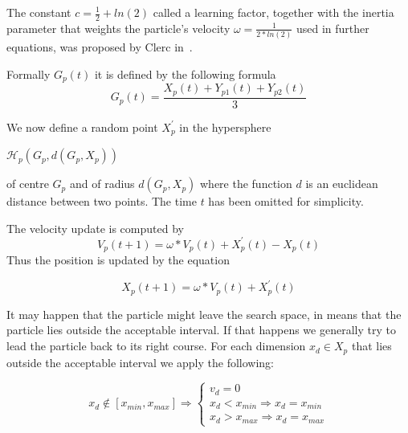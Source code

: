 \documentclass{article}
\begin{document}
The constant $c = \frac{1}{2} + ln(2)$ called a learning factor, together with the inertia parameter that weights the particle's velocity $\omega = \frac{1}{2 * ln(2)}$ used in further equations, was proposed by Clerc in~\cite{pso_anal}.

Formally $G_p(t)$ it is defined by the following formula 
\begin{equation}
	G_p(t) = \frac{X_p(t) + Y_{p1}(t) + Y_{p2}(t)} {3}
\end{equation}

We now define a random point $X^{'}_p$ in the hypersphere
\begin{center}
	$\mathcal{H}_p(G_p, d(G_p, X_p))$ 
\end{center}
of centre $G_p$ and of radius $d(G_p, X_p)$ where the function $d$ is an euclidean distance between two points. The time $t$ has been omitted for simplicity.

The velocity update is computed by
\begin{equation}
	V_p(t+1) = \omega * V_p(t) + X^{'}_p(t) - X_p(t)
\end{equation}
Thus the position is updated by the equation

\begin{equation}
	X_p(t+1) = \omega * V_p(t) + X^{'}_p(t)
\end{equation}




It may happen that the particle might leave the search space, in means that the particle lies outside the acceptable interval. If that happens we generally try to lead the particle back to its right course. For each dimension $x_{d} \in X_p$ that lies  outside the acceptable interval we apply the following:

  \[
	x_{d} \notin [x_{min}, x_{max}] \Rightarrow \left \{
                \begin{array}{ll}
                  v_{d} = 0 \\
                  x_d < x_{min} \Rightarrow x_d = x_{min} \\
                  x_d > x_{max} \Rightarrow x_d = x_{max}
                \end{array}
              \right.
  \]
\end{document}
